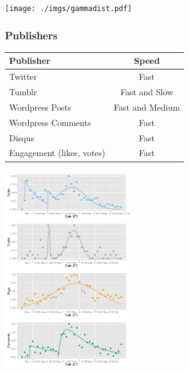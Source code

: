 \documentclass{beamer}
\begin{document}

\begin{frame}
  \begin{center}
   \texttt{[image: ./imgs/gammadist.pdf]}
  \end{center}
\end{frame}

\begin{frame} \frametitle{Publishers}
\begin{table}
\begin{tabular}{l|c}
\hline
   {Publisher}   &   {Speed} \\
\hline 
    Twitter      &    Fast  \\ 
    Tumblr      &        Fast and Slow \\
    Wordpress Posts &   Fast and Medium   \\
    Wordpress Comments & Fast\\
    Disqus       &    Fast\\
    Engagement (likes, votes) &  Fast\\
\hline
\end{tabular}
\end{table}
\end{frame}


\begin{frame}
  \begin{center}
    \includegraphics[height=8.5cm]{./imgs/JPMorgan.pdf}
  \end{center}
\end{frame}


\end{document}
